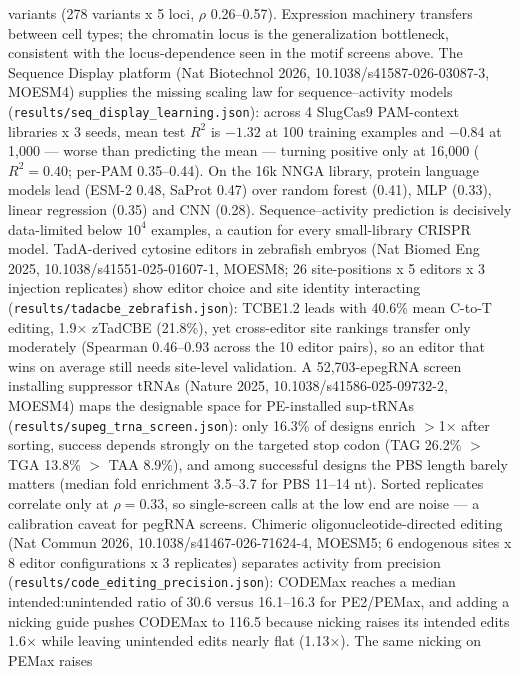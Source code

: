 \documentclass[12pt]{article}
\begin{document}
variants (278 variants x 5 loci, $\rho$ 0.26--0.57). Expression
machinery transfers between cell types; the chromatin locus is the
generalization bottleneck, consistent with the locus-dependence seen in
the motif screens above.
The Sequence Display platform (Nat Biotechnol 2026,
10.1038/s41587-026-03087-3, MOESM4) supplies the missing scaling law
for sequence--activity models (\texttt{results/seq\_display\_learning.json}):
across 4 SlugCas9 PAM-context libraries x 3 seeds, mean test $R^2$ is
$-1.32$ at 100 training examples and $-0.84$ at 1{,}000 --- worse than
predicting the mean --- turning positive only at 16{,}000
($R^2 = 0.40$; per-PAM 0.35--0.44). On the 16k NNGA library, protein
language models lead (ESM-2 0.48, SaProt 0.47) over random forest
(0.41), MLP (0.33), linear regression (0.35) and CNN (0.28).
Sequence--activity prediction is decisively data-limited below
$10^{4}$ examples, a caution for every small-library CRISPR model.
TadA-derived cytosine editors in zebrafish embryos (Nat Biomed Eng 2025,
10.1038/s41551-025-01607-1, MOESM8; 26 site-positions x 5 editors x 3
injection replicates) show editor choice and site identity interacting
(\texttt{results/tadacbe\_zebrafish.json}): TCBE1.2 leads with 40.6\%
mean C-to-T editing, 1.9$\times$ zTadCBE (21.8\%), yet cross-editor
site rankings transfer only moderately (Spearman 0.46--0.93 across the
10 editor pairs), so an editor that wins on average still needs
site-level validation.
A 52{,}703-epegRNA screen installing suppressor tRNAs (Nature 2025,
10.1038/s41586-025-09732-2, MOESM4) maps the designable space for
PE-installed sup-tRNAs (\texttt{results/supeg\_trna\_screen.json}):
only 16.3\% of designs enrich $>$1$\times$ after sorting, success
depends strongly on the targeted stop codon (TAG 26.2\% $>$ TGA 13.8\%
$>$ TAA 8.9\%), and among successful designs the PBS length barely
matters (median fold enrichment 3.5--3.7 for PBS 11--14 nt). Sorted
replicates correlate only at $\rho = 0.33$, so single-screen calls at
the low end are noise --- a calibration caveat for pegRNA screens.
Chimeric oligonucleotide-directed editing (Nat Commun 2026,
10.1038/s41467-026-71624-4, MOESM5; 6 endogenous sites x 8 editor
configurations x 3 replicates) separates activity from precision
(\texttt{results/code\_editing\_precision.json}): CODEMax reaches a
median intended:unintended ratio of 30.6 versus 16.1--16.3 for
PE2/PEMax, and adding a nicking guide pushes CODEMax to 116.5 because
nicking raises its intended edits 1.6$\times$ while leaving unintended
edits nearly flat (1.13$\times$). The same nicking on PEMax raises
\end{document}
